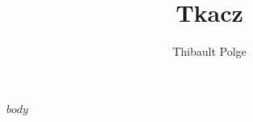\documentclass[french]{book}
\begin{document}
\title{Tkacz}
\author{Thibault Polge%
}

\date{}

\maketitle




$body$

\listoftables
\tableofcontents
\end{document}
